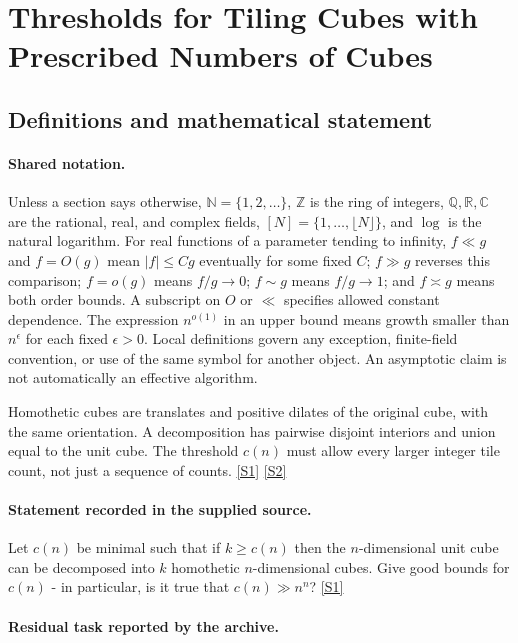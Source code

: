 \documentclass[11pt,a4paper]{article}
\newcommand{\N}{\mathbb{N}}
\newcommand{\Z}{\mathbb{Z}}
\newcommand{\Q}{\mathbb{Q}}
\newcommand{\R}{\mathbb{R}}
\newcommand{\C}{\mathbb{C}}
\newcommand{\sref}[2]{\hyperlink{source:#1:#2}{[S#2]}}
\begin{document}
\section{Thresholds for Tiling Cubes with Prescribed Numbers of Cubes}\label{statement}


\subsection{Definitions and mathematical statement}

\paragraph{Shared notation.}Unless a section says otherwise, $\N=\{1,2,\ldots\}$,
$\Z$ is the ring of integers, $\Q,\R,\C$ are the rational, real, and complex
fields, $[N]=\{1,\ldots,\lfloor N\rfloor\}$, and $\log$ is the natural
logarithm. For real functions of a parameter tending to infinity,
$f\ll g$ and $f=O(g)$ mean $|f|\leq Cg$ eventually for some fixed $C$;
$f\gg g$ reverses this comparison; $f=o(g)$ means $f/g\to0$;
$f\sim g$ means $f/g\to1$; and $f\asymp g$ means both order bounds.
A subscript on $O$ or $\ll$ specifies allowed constant dependence.
The expression $n^{o(1)}$ in an upper bound means growth smaller than
$n^\epsilon$ for each fixed $\epsilon>0$. Local definitions govern any
exception, finite-field convention, or use of the same symbol for another
object. An asymptotic claim is not automatically an effective algorithm.



Homothetic cubes are translates and positive dilates of the original cube, with the same orientation. A decomposition has pairwise disjoint interiors and union equal to the unit cube. The threshold $c(n)$ must allow every larger integer tile count, not just a sequence of counts. \sref{statement}{1} \sref{statement}{2}

\paragraph{Statement recorded in the supplied source.}
Let $c(n)$ be minimal such that if $k\geq c(n)$ then the $n$-dimensional unit cube can be decomposed into $k$ homothetic $n$-dimensional cubes. Give good bounds for $c(n)$ - in particular, is it true that $c(n) \gg n^n$? \sref{statement}{1}

\paragraph{Residual task reported by the archive.}
\end{document}
